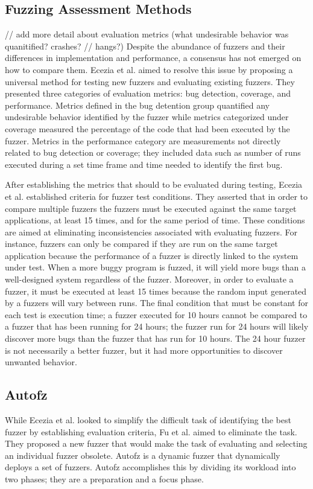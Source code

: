 \subsection{Fuzzing Assessment Methods}
// add more detail about evaluation metrics (what undesirable behavior was quanitified? crashes? 
// hangs?)
Despite the abundance of fuzzers and their differences in implementation and performance, a consensus
has not emerged on how to compare them. Ecezia et al. aimed to resolve this issue by proposing a 
universal method for testing new fuzzers and evaluating existing fuzzers. They presented three 
categories of evaluation metrics: bug detection, coverage, and performance. Metrics defined in the 
bug detention group quantified any undesirable behavior identified by the fuzzer while metrics 
categorized under coverage measured the percentage of the code that had been executed by the fuzzer. 
Metrics in the performance category are measurements not directly related to bug detection or 
coverage; they included data such as number of runs executed during a set time frame and time 
needed to identify the first bug.

After establishing the metrics that should to be evaluated during testing, Ecezia et al. established  criteria for fuzzer test conditions. They asserted that in order to compare multiple fuzzers the fuzzers must be executed against the same target applications, at least 15 times, and for the same period of time. These conditions are aimed at eliminating inconsistencies associated with evaluating fuzzers. For instance, fuzzers can only be compared if they are run on the same target application because the performance of a fuzzer is directly linked to the system under test. When a more buggy program is fuzzed, it will yield more bugs than a well-designed system regardless of the fuzzer. Moreover, in order to evaluate a fuzzer, it must be executed at least 15 times because the random input generated by a fuzzers will vary between runs. The final condition that must be constant for each test is execution time; a fuzzer executed for 10 hours cannot be compared to a fuzzer that has been running for 24 hours; the fuzzer run for 24 hours will likely discover more bugs than the fuzzer that has run for 10 hours. The 24 hour fuzzer is not necessarily a better fuzzer, but it had more opportunities to discover unwanted behavior. \cite{Ecezia}

\subsection{Autofz}
While Ecezia et al. looked to simplify the difficult task of identifying the best fuzzer by establishing evaluation criteria, Fu et al. aimed to eliminate the task. They proposed a new fuzzer that would make the task of evaluating and selecting an individual fuzzer obsolete. Autofz is a dynamic fuzzer that dynamically deploys a set of fuzzers. Autofz accomplishes this by dividing its workload into two phases; they are a preparation and a focus phase.

